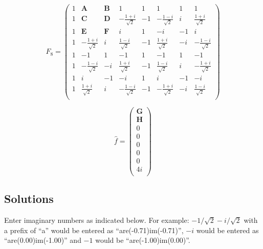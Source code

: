 \begin{equation}
    F_8 = 
    \left(
        \begin{array}{cccccccc}
             1 & \textbf{A} & \textbf{B} & 1 & 1 & 1 & 1 & 1 \\
             1 & \textbf{C} & \textbf{D} & -\frac{1+i}{\sqrt{2}} & -1 & -\frac{1-i}{\sqrt{2}} & i & \frac{1+i}{\sqrt{2}} \\
             1 & \textbf{E} & \textbf{F} & i & 1 & -i & -1 & i \\
             1 & -\frac{1+i}{\sqrt{2}} & i & \frac{1-i}{\sqrt{2}} & -1 & \frac{1+i}{\sqrt{2}} & -i & -\frac{1-i}{\sqrt{2}} \\
             1 & -1 & 1 & -1 & 1 & -1 & 1 & -1 \\
             1 & -\frac{1-i}{\sqrt{2}} & -i & \frac{1+i}{\sqrt{2}} & -1 & \frac{1-i}{\sqrt{2}} & i & -\frac{1+i}{\sqrt{2}} \\
             1 & i & -1 & -i & 1 & i & -1 & -i \\
             1 & \frac{1+i}{\sqrt{2}} & i & -\frac{1-i}{\sqrt{2}} & -1 & -\frac{1+i}{\sqrt{2}} & -i & \frac{1-i}{\sqrt{2}} \\
        \end{array}
    \right) 
\end{equation}


\begin{equation}
    \hat{f} =
    \left(
        \begin{array}{c}
             \textbf{G} \\
             \textbf{H} \\
             0 \\
             0 \\
             0 \\
             0 \\
             0 \\
             4 i \\
        \end{array}
    \right)
\end{equation}

\subsection*{Solutions}

Enter imaginary numbers as indicated below. For example: $-1/\sqrt{2}-i/\sqrt{2}$ with a prefix of ``a'' would be entered as ``are(-0.71)im(-0.71)'', $-i$ would be entered as ``are(0.00)im(-1.00)'' and $-1$ would be ``are(-1.00)im(0.00)''.

